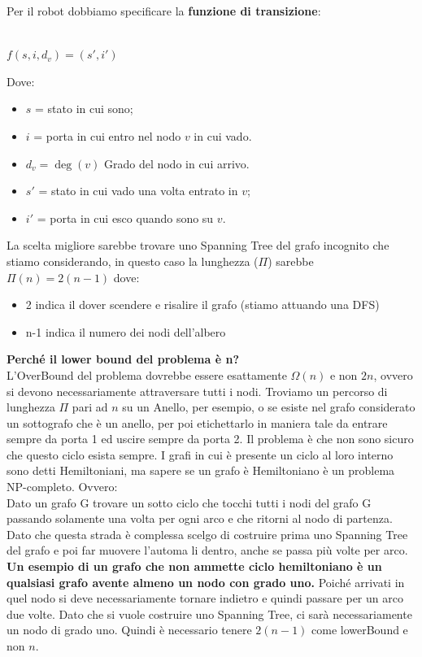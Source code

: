 Per il robot dobbiamo specificare la \textbf{funzione di transizione}:\\\\
\begin{center}
    $f(s,i,d_v) = (s',i')$
\end{center}

Dove:
\begin{itemize}
    \item $s$ = stato in cui sono;
    \item $i$ = porta in cui entro nel nodo $v$ in cui vado.
    \item $d_v = \deg(v)$ Grado del nodo in cui arrivo.
    \item $s'$ = stato in cui vado una volta entrato in $v$;
    \item $i'$ = porta in cui esco quando sono su $v$.
\end{itemize}

La scelta migliore sarebbe trovare uno Spanning Tree del grafo incognito che
stiamo considerando, in questo caso la lunghezza ($\Pi$) sarebbe $\Pi(n) =
    2(n-1)$ dove:
\begin{itemize}
    \item 2 indica il dover scendere e risalire il grafo (stiamo attuando una DFS)
    \item n-1 indica il numero dei nodi dell'albero
\end{itemize}
\textbf{Perché il lower bound del problema è n?}\\
L'OverBound del problema dovrebbe essere esattamente $\Omega(n)$ e non $2n$,
ovvero si devono necessariamente attraversare tutti i nodi. Troviamo un percorso
di lunghezza $\Pi$ pari ad $n$ su un Anello, per esempio, o se esiste nel grafo
considerato un sottografo che è un anello, per poi etichettarlo in maniera tale
da entrare sempre da porta 1 ed uscire sempre da porta 2. Il problema è che non
sono sicuro che questo ciclo esista sempre. I grafi in cui è presente un ciclo
al loro interno sono detti Hemiltoniani, ma sapere se un grafo è Hemiltoniano è
un problema NP-completo. Ovvero:\\ Dato un grafo G trovare un sotto ciclo che
tocchi tutti i nodi del grafo G passando solamente una volta per ogni arco e che
ritorni al nodo di partenza.\\
Dato che questa strada è complessa scelgo di costruire prima uno Spanning Tree
del grafo e poi far muovere l'automa li dentro, anche se passa più volte per
arco. \\\textbf{Un esempio di un grafo che non ammette ciclo hemiltoniano è un
    qualsiasi grafo avente almeno un nodo con grado uno.} Poiché arrivati in quel
nodo si deve necessariamente tornare indietro e quindi passare per un arco due
volte. Dato che si vuole costruire uno Spanning Tree, ci sarà necessariamente un
nodo di grado uno. Quindi è necessario tenere $2(n-1)$ come lowerBound e non
$n$.

